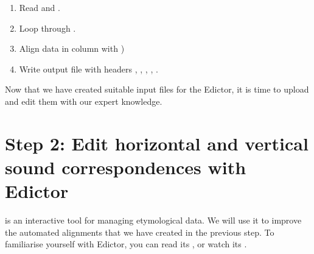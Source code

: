 \documentclass[letterpaper,10pt,english]{sphinxmanual}
\begin{document}
{{{{

\begin{fulllineitems}
\label{\detokenize{mkedictor:ronataswestoldturkiccommands.maketoedict_ad.run}}
\pysigstartsignatures
{}
\pysigstopsignatures\begin{enumerate}
%
\item {} 
\sphinxAtStartPar
Read  and .

\item {} 
\sphinxAtStartPar
Loop through .

\item {} 
\sphinxAtStartPar
Align data in column  with )

\item {} 
\sphinxAtStartPar
Write output file with headers
, , , , .

\end{enumerate}

\end{fulllineitems}


\sphinxAtStartPar
Now that we have created suitable input files for the Edictor, it is time to
upload and edit them with our expert knowledge.


\section{Step 2: Edit horizontal and vertical sound correspondences with Edictor}
\label{\detokenize{mkedictor:step-2-edit-horizontal-and-vertical-sound-correspondences-with-edictor}}
\sphinxAtStartPar
{} is an interactive tool for managing
etymological data. We will use it to improve the automated alignments that we
have created in the previous step. To familiarise yourself with Edictor, you
can read its ,
 or watch its
.

}}}}
\end{document}
